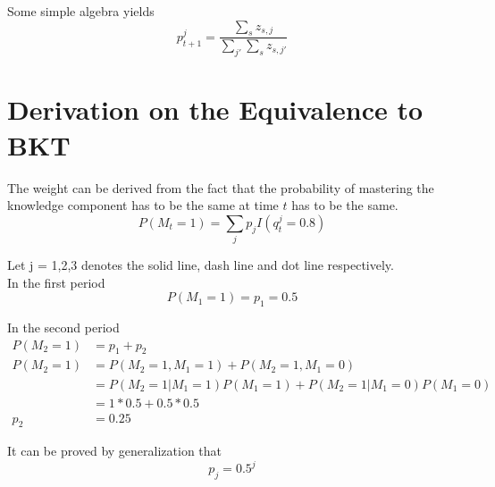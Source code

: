 \documentclass{article}
\begin{document}
Some simple algebra yields
\[
p^j_{t+1} = \frac{\sum_{s} z_{s,j}}{\sum_{j'}\sum_{s} z_{s,j'}}
\]

\section{Derivation on the Equivalence to BKT}
The weight can be derived from the fact that the probability of mastering the knowledge component has to be the same at time $t$ has to be the same.
\[
P(M_t=1) = \sum_j p_jI(q_t^j=0.8)
\]

Let j = 1,2,3 denotes the solid line, dash line and dot line respectively.\\

In the first period
\[P(M_1=1)=p_1 = 0.5\]

In the second period
\begin{align*}
P(M_2=1) &=p_1+p_2\\
P(M_2=1) &= P(M_2=1,M_1=1)+P(M_2=1,M_1=0)\\
		 &= P(M_2=1|M_1=1)P(M_1=1)+P(M_2=1|M_1=0)P(M_1=0)\\
		 & = 1*0.5+0.5*0.5\\
p_2 &= 0.25
\end{align*}

It can be proved by generalization that
\[
p_j = 0.5^j
\]
\end{document}
